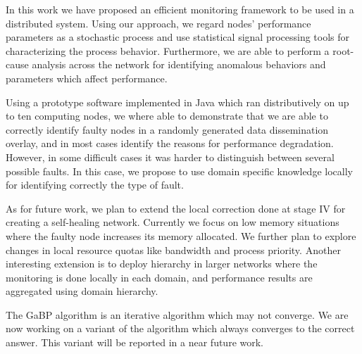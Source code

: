 \documentclass[times, 10pt,twocolumn]{article}
\begin{document}
\label{sec:conc}
In this work we have proposed an efficient monitoring framework to be used in a distributed system.
Using our approach, we regard nodes' performance parameters as a stochastic process and use statistical signal processing tools for characterizing the process behavior. Furthermore, we are able to perform a root-cause analysis across the network for identifying anomalous behaviors and parameters which affect performance.

Using a prototype software implemented in Java which ran distributively on up to ten computing nodes, we where able
to demonstrate that we are able to correctly identify faulty nodes in a randomly generated data dissemination overlay, and in most cases identify the reasons for performance degradation. However, in some difficult cases it was harder to
distinguish between several possible faults. In this case, we propose to use domain specific knowledge locally
for identifying correctly the type of fault.

As for future work, we plan to extend the local correction done at stage IV for creating a self-healing network.
Currently we focus on low memory situations where the faulty node increases its memory allocated.
We further plan to explore changes in local resource quotas like bandwidth and process priority. Another interesting
extension is to deploy hierarchy in larger networks where the monitoring is done locally in each domain, and performance results are aggregated using domain hierarchy.

The GaBP algorithm is an iterative algorithm which may not converge. We are now working on a variant of the algorithm
which always converges to the correct answer. This variant will be reported in a near future work.


\end{document}

